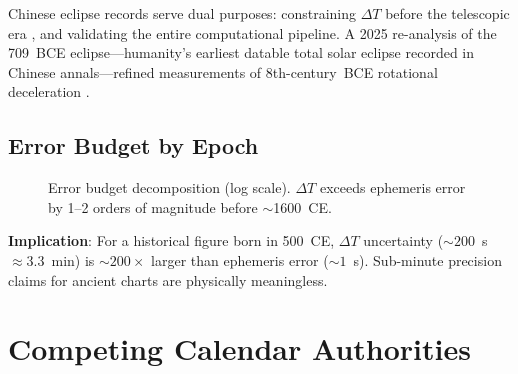 \documentclass[10pt,a4paper]{article}
\begin{document}
Chinese eclipse records serve dual purposes: constraining $\Delta T$ before
the telescopic era \cite{stephenson2018}, and validating the entire
computational pipeline. A 2025 re-analysis of the 709~BCE eclipse---humanity's
earliest datable total solar eclipse recorded in Chinese annals---refined
measurements of 8th-century~BCE rotational deceleration
\cite{eclipse709bce_2025}.

\subsection{Error Budget by Epoch}

\begin{figure}[H]
\centering
{}
\caption{Error budget decomposition (log scale). $\Delta T$ exceeds ephemeris
error by 1--2 orders of magnitude before $\sim$1600~CE.}
\label{fig:error_budget}
\end{figure}

\textbf{Implication}: For a historical figure born in 500~CE, $\Delta T$
uncertainty ($\sim 200$~s $\approx 3.3$~min) is $\sim 200\times$ larger than
ephemeris error ($\sim 1$~s). Sub-minute precision claims for ancient charts
are physically meaningless.


\section{Competing Calendar Authorities}
\label{sec:authorities}
\end{document}
